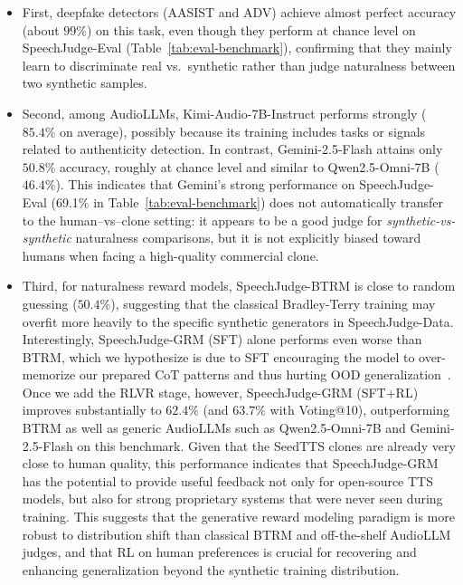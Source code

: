 \documentclass[]{bytedance_seed}
\begin{document}
\begin{itemize}[itemsep=0ex,leftmargin=3ex]
\item First, deepfake detectors (AASIST and ADV) achieve almost perfect accuracy
(about $99\%$) on this task, even though they perform at chance level on
{SpeechJudge-Eval} (Table~\ref{tab:eval-benchmark}), confirming that they
mainly learn to discriminate real vs.\ synthetic rather than judge naturalness
between two synthetic samples.
\item Second, among AudioLLMs, Kimi-Audio-7B-Instruct performs strongly
($85.4\%$ on average), possibly because its training includes tasks or signals
related to authenticity detection. In contrast, Gemini-2.5-Flash attains only $50.8\%$ accuracy,
roughly at chance level and similar to Qwen2.5-Omni-7B ($46.4\%$).
This indicates that Gemini’s strong performance on {SpeechJudge-Eval}
(69.1\% in Table~\ref{tab:eval-benchmark}) does not automatically transfer to
the human--vs--clone setting: it appears to be a good judge for
\textit{synthetic-vs-synthetic} naturalness comparisons, but it is not explicitly
biased toward humans when facing a high-quality commercial clone.
\item Third, for naturalness reward models, SpeechJudge-BTRM is close to random
guessing ($50.4\%$), suggesting that the classical Bradley-Terry training may
overfit more heavily to the specific synthetic generators in
{SpeechJudge-Data}.
Interestingly, SpeechJudge-GRM (SFT) alone performs even worse than BTRM,
which we hypothesize is due to SFT encouraging the model to over-memorize our
prepared CoT patterns and thus hurting OOD generalization~\citep{gem,sft-rl-mayi}.
Once we add the RLVR stage, however, SpeechJudge-GRM (SFT+RL) improves
substantially to $62.4\%$ (and $63.7\%$ with Voting@10), outperforming BTRM
as well as generic AudioLLMs such as Qwen2.5-Omni-7B and Gemini-2.5-Flash on
this benchmark.
Given that the SeedTTS clones are already very close to human quality, this
performance indicates that SpeechJudge-GRM has the potential to provide useful
feedback not only for open-source TTS models, but also for strong proprietary
systems that were never seen during training.
This suggests that the generative reward modeling paradigm is more robust to
distribution shift than classical BTRM and off-the-shelf AudioLLM judges, and
that RL on human preferences is crucial for recovering and enhancing
generalization beyond the synthetic training distribution.
\end{itemize}
\end{document}
